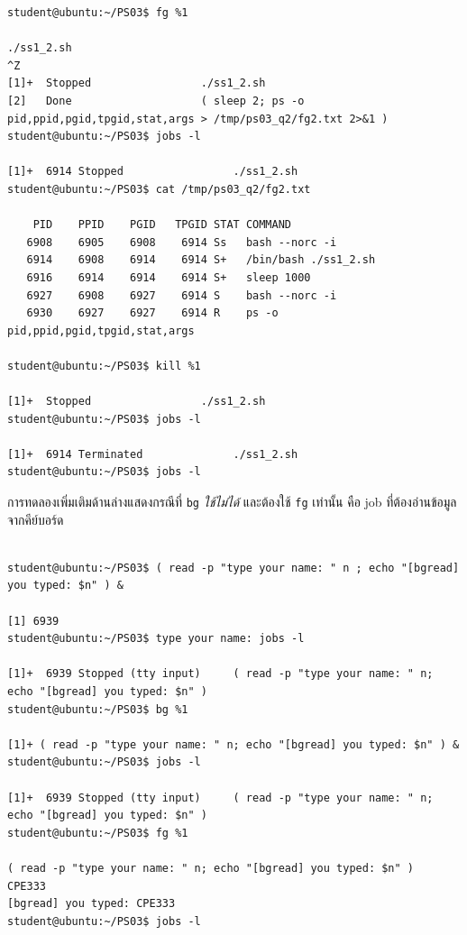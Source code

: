 \documentclass[a4paper,11pt]{article}
\newcommand{\code}[1]{\texttt{#1}}
\begin{document}
\begin{lstlisting}[style=terminal,caption={\code{fg} ดึงกลับมาเป็น foreground และคืนสิทธิ์ terminal ให้ job แล้วปิดงานด้วย \code{kill \%1}}]
student@ubuntu:~/PS03$ fg %1

./ss1_2.sh
^Z
[1]+  Stopped                 ./ss1_2.sh
[2]   Done                    ( sleep 2; ps -o pid,ppid,pgid,tpgid,stat,args > /tmp/ps03_q2/fg2.txt 2>&1 )
student@ubuntu:~/PS03$ jobs -l

[1]+  6914 Stopped                 ./ss1_2.sh
student@ubuntu:~/PS03$ cat /tmp/ps03_q2/fg2.txt

    PID    PPID    PGID   TPGID STAT COMMAND
   6908    6905    6908    6914 Ss   bash --norc -i
   6914    6908    6914    6914 S+   /bin/bash ./ss1_2.sh
   6916    6914    6914    6914 S+   sleep 1000
   6927    6908    6927    6914 S    bash --norc -i
   6930    6927    6927    6914 R    ps -o pid,ppid,pgid,tpgid,stat,args

student@ubuntu:~/PS03$ kill %1

[1]+  Stopped                 ./ss1_2.sh
student@ubuntu:~/PS03$ jobs -l

[1]+  6914 Terminated              ./ss1_2.sh
student@ubuntu:~/PS03$ jobs -l
\end{lstlisting}

การทดลองเพิ่มเติมด้านล่างแสดงกรณีที่ \code{bg} \emph{ใช้ไม่ได้} และต้องใช้ \code{fg}
เท่านั้น คือ job ที่ต้องอ่านข้อมูลจากคีย์บอร์ด

\begin{lstlisting}[style=terminal,caption={job ที่อ่าน stdin จะถูกหยุดเองด้วย SIGTTIN}]

student@ubuntu:~/PS03$ ( read -p "type your name: " n ; echo "[bgread] you typed: $n" ) &

[1] 6939
student@ubuntu:~/PS03$ type your name: jobs -l

[1]+  6939 Stopped (tty input)     ( read -p "type your name: " n; echo "[bgread] you typed: $n" )
student@ubuntu:~/PS03$ bg %1

[1]+ ( read -p "type your name: " n; echo "[bgread] you typed: $n" ) &
student@ubuntu:~/PS03$ jobs -l

[1]+  6939 Stopped (tty input)     ( read -p "type your name: " n; echo "[bgread] you typed: $n" )
student@ubuntu:~/PS03$ fg %1

( read -p "type your name: " n; echo "[bgread] you typed: $n" )
CPE333
[bgread] you typed: CPE333
student@ubuntu:~/PS03$ jobs -l
\end{lstlisting}
\end{document}
